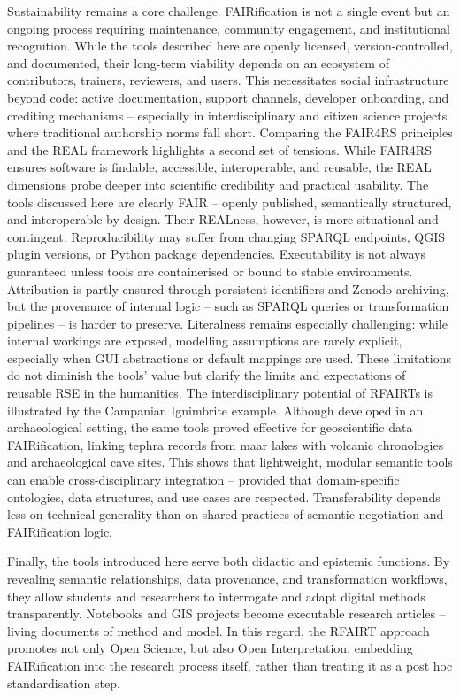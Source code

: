\documentclass{eceasst}
\begin{document}
Sustainability remains a core challenge. FAIRification is not a single event but an ongoing process requiring maintenance, community engagement, and institutional recognition. While the tools described here are openly licensed, version-controlled, and documented, their long-term viability depends on an ecosystem of contributors, trainers, reviewers, and users. This necessitates social infrastructure beyond code: active documentation, support channels, developer onboarding, and crediting mechanisms – especially in interdisciplinary and citizen science projects where traditional authorship norms fall short. Comparing the FAIR4RS principles and the REAL framework highlights a second set of tensions. While FAIR4RS ensures software is findable, accessible, interoperable, and reusable, the REAL dimensions probe deeper into scientific credibility and practical usability. The tools discussed here are clearly FAIR – openly published, semantically structured, and interoperable by design. Their REALness, however, is more situational and contingent. Reproducibility may suffer from changing SPARQL endpoints, QGIS plugin versions, or Python package dependencies. Executability is not always guaranteed unless tools are containerised or bound to stable environments. Attribution is partly ensured through persistent identifiers and Zenodo archiving, but the provenance of internal logic – such as SPARQL queries or transformation pipelines – is harder to preserve. Literalness remains especially challenging: while internal workings are exposed, modelling assumptions are rarely explicit, especially when GUI abstractions or default mappings are used. These limitations do not diminish the tools’ value but clarify the limits and expectations of reusable RSE in the humanities. The interdisciplinary potential of RFAIRTs is illustrated by the Campanian Ignimbrite example. Although developed in an archaeological setting, the same tools proved effective for geoscientific data FAIRification, linking tephra records from maar lakes with volcanic chronologies and archaeological cave sites. This shows that lightweight, modular semantic tools can enable cross-disciplinary integration – provided that domain-specific ontologies, data structures, and use cases are respected. Transferability depends less on technical generality than on shared practices of semantic negotiation and FAIRification logic.

Finally, the tools introduced here serve both didactic and epistemic functions. By revealing semantic relationships, data provenance, and transformation workflows, they allow students and researchers to interrogate and adapt digital methods transparently. Notebooks and GIS projects become executable research articles – living documents of method and model. In this regard, the RFAIRT approach promotes not only Open Science, but also Open Interpretation: embedding FAIRification into the research process itself, rather than treating it as a post hoc standardisation step.
\end{document}
